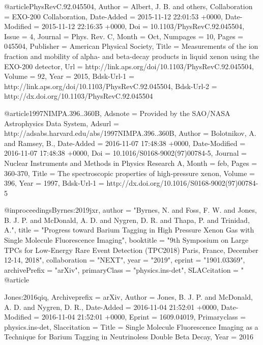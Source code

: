 {{{{{{{{{@article{PhysRevC.92.045504,
	Author = {Albert, J. B. and others},
	Collaboration = {EXO-200 Collaboration},
	Date-Added = {2015-11-12 22:01:53 +0000},
	Date-Modified = {2015-11-12 22:16:35 +0000},
	Doi = {10.1103/PhysRevC.92.045504},
	Issue = {4},
	Journal = {Phys. Rev. C},
	Month = {Oct},
	Numpages = {10},
	Pages = {045504},
	Publisher = {American Physical Society},
	Title = {Measurements of the ion fraction and mobility of alpha- and beta-decay products in liquid xenon using the EXO-200 detector},
	Url = {http://link.aps.org/doi/10.1103/PhysRevC.92.045504},
	Volume = {92},
	Year = {2015},
	Bdsk-Url-1 = {http://link.aps.org/doi/10.1103/PhysRevC.92.045504},
	Bdsk-Url-2 = {http://dx.doi.org/10.1103/PhysRevC.92.045504}}

@article{1997NIMPA.396..360B,
	Adsnote = {Provided by the SAO/NASA Astrophysics Data System},
	Adsurl = {http://adsabs.harvard.edu/abs/1997NIMPA.396..360B},
	Author = {{Bolotnikov}, A. and {Ramsey}, B.},
	Date-Added = {2016-11-07 17:48:38 +0000},
	Date-Modified = {2016-11-07 17:48:38 +0000},
	Doi = {10.1016/S0168-9002(97)00784-5},
	Journal = {Nuclear Instruments and Methods in Physics Research A},
	Month = feb,
	Pages = {360-370},
	Title = {{The spectroscopic properties of high-pressure xenon}},
	Volume = 396,
	Year = 1997,
	Bdsk-Url-1 = {http://dx.doi.org/10.1016/S0168-9002(97)00784-5}}


@inproceedings{Byrnes:2019jxr,
      author         = "Byrnes, N. and Foss, F. W. and Jones, B. J. P. and
                        McDonald, A. D. and Nygren, D. R. and Thapa, P. and
                        Trinidad, A.",
      title          = "{Progress toward Barium Tagging in High Pressure Xenon
                        Gas with Single Molecule Fluorescence Imaging}",
      booktitle      = "{9th Symposium on Large TPCs for Low-Energy Rare Event
                        Detection (TPC2018) Paris, France, December 12-14, 2018}",
      collaboration  = "NEXT",
      year           = "2019",
      eprint         = "1901.03369",
      archivePrefix  = "arXiv",
      primaryClass   = "physics.ins-det",
      SLACcitation   = "%
}
@article{Jones:2016qiq,
	Archiveprefix = {arXiv},
	Author = {Jones, B. J. P. and McDonald, A. D. and Nygren, D. R.},
	Date-Added = {2016-11-04 21:52:01 +0000},
	Date-Modified = {2016-11-04 21:52:01 +0000},
	Eprint = {1609.04019},
	Primaryclass = {physics.ins-det},
	Slaccitation = {%
	Title = {{Single Molecule Fluorescence Imaging as a Technique for Barium Tagging in Neutrinoless Double Beta Decay}},
	Year = {2016}}

}}}}}}}}}}

